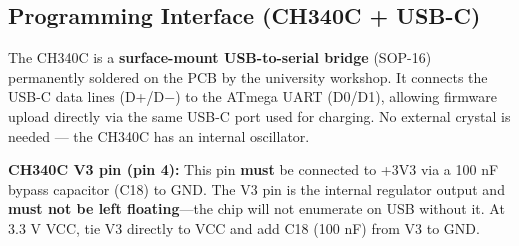 \documentclass[a4paper,11pt]{article}
\renewcommand*{\,}{ }%
\begin{document}
\subsection{Programming Interface (CH340C + USB-C)}

The CH340C is a \textbf{surface-mount USB-to-serial bridge} (SOP-16) permanently soldered on the PCB by the university workshop. It connects the USB-C data lines (D+/D$-$) to the ATmega UART (D0/D1), allowing firmware upload directly via the same USB-C port used for charging. No external crystal is needed --- the CH340C has an internal oscillator.

\begin{warningbox}
\textbf{CH340C V3 pin (pin 4):} This pin \textbf{must} be connected to +3V3 via a 100\,nF bypass capacitor (C18) to GND. The V3 pin is the internal regulator output and \textbf{must not be left floating}---the chip will not enumerate on USB without it. At 3.3\,V VCC, tie V3 directly to VCC and add C18 (100\,nF) from V3 to GND.
\end{warningbox}
\end{document}
